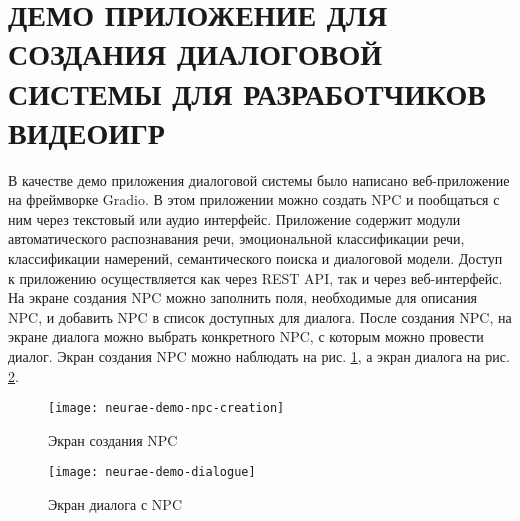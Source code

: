 \section{ДЕМО ПРИЛОЖЕНИЕ ДЛЯ СОЗДАНИЯ ДИАЛОГОВОЙ СИСТЕМЫ ДЛЯ РАЗРАБОТЧИКОВ ВИДЕОИГР}
В качестве демо приложения диалоговой системы было написано веб-приложение на фреймворке Gradio. В этом приложении можно создать NPC и пообщаться с ним через текстовый или аудио интерфейс. Приложение содержит модули автоматического распознавания речи, эмоциональной классификации речи, классификации намерений, семантического поиска и диалоговой модели. Доступ к приложению осуществляется как через REST API, так и через веб-интерфейс. На экране создания NPC можно заполнить поля, необходимые для описания NPC, и добавить NPC в список доступных для диалога. После создания NPC, на экране диалога можно выбрать конкретного NPC, с которым можно провести диалог. Экран создания NPC можно наблюдать на рис. \ref{demo-npc-creation}, а экран диалога на рис. \ref{demo-dialogue}.
\begin{figure}[H]
    \centering
    \texttt{[image: neurae-demo-npc-creation]}
    \caption{Экран создания NPC}
    \label{demo-npc-creation}
\end{figure}
\begin{figure}[H]
    \centering
    \texttt{[image: neurae-demo-dialogue]}
    \caption{Экран диалога с NPC}
    \label{demo-dialogue}
\end{figure}